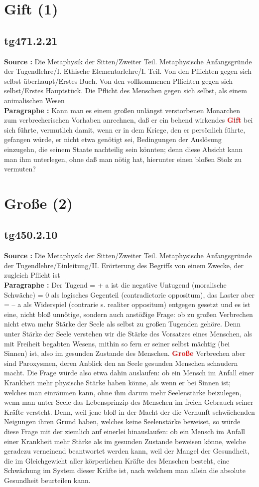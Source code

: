 \documentclass[a4paper,12pt,twoside]{book}
\newcommand{\match}[1]{\textcolor{red}{\textbf{#1}}}
\newcommand{\unnumberedsection}[1]{
	\section*{#1}
	\addcontentsline{toc}{section}{#1}
	\markright{#1}
}
\begin{document}
	\unnumberedsection{Gift (1)} 
	\subsection*{tg471.2.21} 
	\textbf{Source : }Die Metaphysik der Sitten/Zweiter Teil. Metaphysische Anfangsgründe der Tugendlehre/I. Ethische Elementarlehre/I. Teil. Von den Pflichten gegen sich selbst überhaupt/Erstes Buch. Von den vollkommenen Pflichten gegen sich selbst/Erstes Hauptstück. Die Pflicht des Menschen gegen sich selbst, als einem animalischen Wesen\\  
	
	\textbf{Paragraphe : }Kann man es einem großen unlängst verstorbenen Monarchen zum verbrecherischen Vorhaben anrechnen, daß er ein behend wirkendes \match{Gift} bei sich führte, vermutlich damit, wenn er in dem Kriege, den er persönlich führte, gefangen würde, er nicht etwa genötigt sei, Bedingungen der Auslösung einzugehn, die seinem Staate nachteilig sein könnten; denn diese Absicht kann man ihm unterlegen, ohne daß man nötig hat, hierunter einen bloßen Stolz zu vermuten? 
	
	\unnumberedsection{Große (2)} 
	\subsection*{tg450.2.10} 
	\textbf{Source : }Die Metaphysik der Sitten/Zweiter Teil. Metaphysische Anfangsgründe der Tugendlehre/Einleitung/II. Erörterung des Begriffs von einem Zwecke, der zugleich Pflicht ist\\  
	
	\textbf{Paragraphe : }Der Tugend = + a ist die negative Untugend (moralische Schwäche) = 0 als logisches Gegenteil (contradictorie oppositum), das Laster aber = – a als Widerspiel (contrarie s. realiter oppositum) entgegen gesetzt und es ist eine, nicht bloß unnötige, sondern auch anstößige Frage: ob zu großen Verbrechen nicht etwa mehr Stärke der Seele als selbst zu großen Tugenden gehöre. Denn unter Stärke der Seele verstehen wir die Stärke des Vorsatzes eines Menschen, als mit Freiheit begabten Wesens, mithin so fern er seiner selbst mächtig (bei Sinnen) ist, also im gesunden Zustande des Menschen. \match{Große} Verbrechen aber sind Paroxysmen, deren Anblick den an Seele gesunden Menschen schaudern macht. Die Frage würde also etwa dahin auslaufen: ob ein Mensch im Anfall einer Krankheit mehr physische Stärke haben könne, als wenn er bei Sinnen ist; welches  man einräumen kann, ohne ihm darum mehr Seelenstärke beizulegen, wenn man unter Seele das Lebensprinzip des Menschen im freien Gebrauch seiner Kräfte versteht. Denn, weil jene bloß in der Macht der die Vernunft schwächenden Neigungen ihren Grund haben, welches keine Seelenstärke beweiset, so würde diese Frage mit der ziemlich auf einerlei hinauslaufen: ob ein Mensch im Anfall einer Krankheit mehr Stärke als im gesunden Zustande beweisen könne, welche geradezu verneinend beantwortet werden kann, weil der Mangel der Gesundheit, die im Gleichgewicht aller körperlichen Kräfte des Menschen besteht, eine Schwächung im System dieser Kräfte ist, nach welchem man allein die absolute Gesundheit beurteilen kann. 
	
\end{document}
